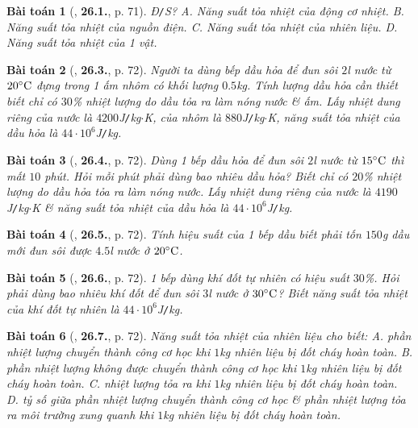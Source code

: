 \documentclass{article}
\numberwithin{equation}{section}
\newtheorem{baitoan}{Bài toán}
\begin{document}
\begin{baitoan}[\cite{SBT_Vat_Ly_8}, \textbf{26.1.}, p. 71]
	\emph{Đ\texttt{/}S?} {\sf A.} Năng suất tỏa nhiệt của động cơ nhiệt. {\sf B.} Năng suất tỏa nhiệt của nguồn điện. {\sf C.} Năng suất tỏa nhiệt của nhiên liệu. {\sf D.} Năng suất tỏa nhiệt của 1 vật.
\end{baitoan}

\begin{baitoan}[\cite{SBT_Vat_Ly_8}, \textbf{26.3.}, p. 72]
	Người ta dùng bếp dầu hỏa để đun sôi $2$\emph{l} nước từ $20^\circ{\rm C}$ đựng trong 1 ấm nhôm có khối lượng $0.5$\emph{kg}. Tính lượng dầu hỏa cần thiết biết chỉ có $30$\% nhiệt lượng do dầu tỏa ra làm nóng nước \& ấm. Lấy nhiệt dung riêng của nước là $4200$\emph{J\texttt{/}kg$\cdot$K}, của nhôm là $880$\emph{J\texttt{/}kg$\cdot$K}, năng suất tỏa nhiệt của dầu hỏa là $44\cdot10^6$\emph{J\texttt{/}kg}.
\end{baitoan}

\begin{baitoan}[\cite{SBT_Vat_Ly_8}, \textbf{26.4.}, p. 72]
	Dùng 1 bếp dầu hỏa để đun sôi $2$\emph{l} nước từ $15^\circ{\rm C}$ thì mất $10$ phút. Hỏi mỗi phút phải dùng bao nhiêu dầu hỏa? Biết chỉ có $20$\% nhiệt lượng do dầu hỏa tỏa ra làm nóng nước. Lấy nhiệt dung riêng của nước là $4190$\emph{J\texttt{/}kg$\cdot$K} \& năng suất tỏa nhiệt của dầu hỏa là $44\cdot10^6$\emph{J\texttt{/}kg}.
\end{baitoan}

\begin{baitoan}[\cite{SBT_Vat_Ly_8}, \textbf{26.5.}, p. 72]
	Tính hiệu suất của 1 bếp dầu biết phải tốn $150$\emph{g} dầu mới đun sôi được $4.5$\emph{l} nước ở $20^\circ{\rm C}$.
\end{baitoan}

\begin{baitoan}[\cite{SBT_Vat_Ly_8}, \textbf{26.6.}, p. 72]
	1 bếp dùng khí đốt tự nhiên có hiệu suất $30$\%. Hỏi phải dùng bao nhiêu khí đốt để đun sôi $3$\emph{l} nước ở $30^\circ{\rm C}$? Biết năng suất tỏa nhiệt của khí đốt tự nhiên là $44\cdot10^6$\emph{J\texttt{/}kg}.
\end{baitoan}

\begin{baitoan}[\cite{SBT_Vat_Ly_8}, \textbf{26.7.}, p. 72]
	Năng suất tỏa nhiệt của nhiên liệu cho biết: {\sf A.} phần nhiệt lượng chuyển thành công cơ học khi $1$\emph{kg} nhiên liệu bị đốt cháy hoàn toàn. {\sf B.} phần nhiệt lượng không được chuyển thành công cơ học khi $1$\emph{kg} nhiên liệu bị đốt cháy hoàn toàn. {\sf C.} nhiệt lượng tỏa ra khi $1$\emph{kg} nhiên liệu bị đốt cháy hoàn toàn. {\sf D.} tỷ số giữa phần nhiệt lượng chuyển thành công cơ học \& phần nhiệt lượng tỏa ra môi trường xung quanh khi $1$\emph{kg} nhiên liệu bị đốt cháy hoàn toàn.
\end{baitoan}
\end{document}
